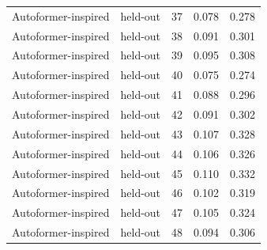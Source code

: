 \begin{tabular}{llrrr}
Autoformer-inspired & held-out & 37 & 0.078 & 0.278 \\
Autoformer-inspired & held-out & 38 & 0.091 & 0.301 \\
Autoformer-inspired & held-out & 39 & 0.095 & 0.308 \\
Autoformer-inspired & held-out & 40 & 0.075 & 0.274 \\
Autoformer-inspired & held-out & 41 & 0.088 & 0.296 \\
Autoformer-inspired & held-out & 42 & 0.091 & 0.302 \\
Autoformer-inspired & held-out & 43 & 0.107 & 0.328 \\
Autoformer-inspired & held-out & 44 & 0.106 & 0.326 \\
Autoformer-inspired & held-out & 45 & 0.110 & 0.332 \\
Autoformer-inspired & held-out & 46 & 0.102 & 0.319 \\
Autoformer-inspired & held-out & 47 & 0.105 & 0.324 \\
Autoformer-inspired & held-out & 48 & 0.094 & 0.306 \\
\bottomrule
\end{tabular}
